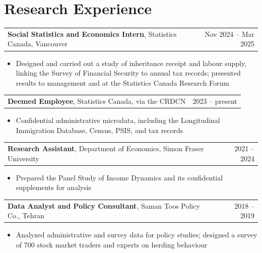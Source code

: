 \documentclass[11pt,letterpaper]{article}
\makeatletter
\newcommand{\entry}[2]{\noindent\begin{tabularx}{\linewidth}{@{}X r@{}}#1 & #2\end{tabularx}\par}
\makeatother
\begin{document}
\section{Research Experience}
\entry{\textbf{Social Statistics and Economics Intern}, Statistics Canada, Vancouver}{Nov 2024 -- Mar 2025}
\begin{itemize}
  \item Designed and carried out a study of inheritance receipt and labour supply, linking the Survey of Financial Security to annual tax records; presented results to management and at the Statistics Canada Research Forum
\end{itemize}
\entry{\textbf{Deemed Employee}, Statistics Canada, via the CRDCN}{2023 -- present}
\begin{itemize}
  \item Confidential administrative microdata, including the Longitudinal Immigration Database, Census, PSIS, and tax records
\end{itemize}
\entry{\textbf{Research Assistant}, Department of Economics, Simon Fraser University}{2021 -- 2024}
\begin{itemize}
  \item Prepared the Panel Study of Income Dynamics and its confidential supplements for analysis
\end{itemize}
\entry{\textbf{Data Analyst and Policy Consultant}, Saman Toos Policy Co., Tehran}{2018 -- 2019}
\begin{itemize}
  \item Analyzed administrative and survey data for policy studies; designed a survey of 700 stock market traders and experts on herding behaviour
\end{itemize}
\end{document}

